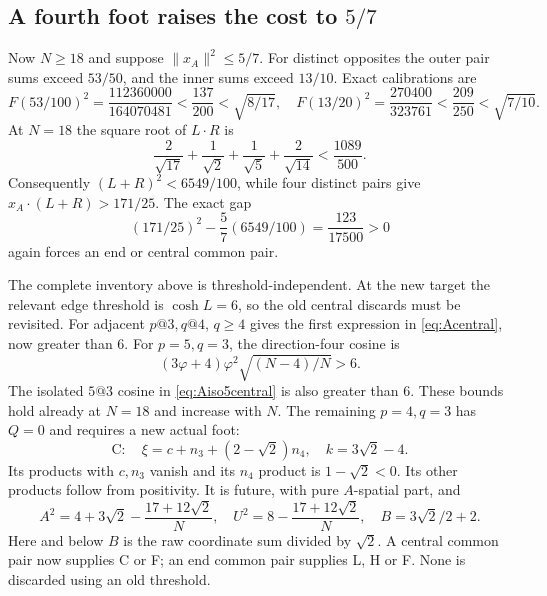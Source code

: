\documentclass[11pt]{article}
\theoremstyle{remark}
\newcommand{\ph}{\varphi}
\begin{document}
\subsection{A fourth foot raises the cost to \texorpdfstring{\(5/7\)}{5/7}}

Now \(N\ge18\) and suppose \(\|x_A\|^2\le5/7\).
For distinct opposites the outer pair sums exceed \(53/50\),
and the inner sums exceed \(13/10\). Exact calibrations are
\[
 F(53/100)^2=\frac{112360000}{164070481}
 <\frac{137}{200}<\sqrt{8/17},\quad
 F(13/20)^2=\frac{270400}{323761}
 <\frac{209}{250}<\sqrt{7/10}.
\]
At \(N=18\) the square root of \(L\cdot R\) is
\[
 \frac2{\sqrt{17}}+\frac1{\sqrt2}+\frac1{\sqrt5}
                 +\frac2{\sqrt{14}}<\frac{1089}{500}.
\]
Consequently \((L+R)^2<6549/100\), while four distinct pairs give
\(x_A\cdot(L+R)>171/25\). The exact gap
\[
 (171/25)^2-\frac57(6549/100)=\frac{123}{17500}>0
\]
again forces an end or central common pair.

The complete inventory above is threshold-independent.
At the new target the relevant edge threshold is \(\cosh L=6\),
so the old central discards must be revisited.
For adjacent \(p@3,q@4\), \(q\ge4\) gives the first expression
in \eqref{eq:Acentral}, now greater than \(6\).
For \(p=5,q=3\), the direction-four cosine is
\[
 (3\ph+4)\ph^2\sqrt{(N-4)/N}>6.
\]
The isolated \(5@3\) cosine in \eqref{eq:Aiso5central} is also
greater than \(6\). These bounds hold already at \(N=18\)
and increase with \(N\).
The remaining \(p=4,q=3\) has \(Q=0\) and requires a new actual foot:
\begin{equation}\label{eq:Cfoot}
 \mathrm C:\quad \xi=c+n_3+(2-\sqrt2)n_4,\quad
 k=3\sqrt2-4.
\end{equation}
Its products with \(c,n_3\) vanish and its \(n_4\) product is
\(1-\sqrt2<0\). Its other products follow from positivity.
It is future, with pure \(A\)-spatial part, and
\[
 A^2=4+3\sqrt2-\frac{17+12\sqrt2}{N},\quad
 U^2=8-\frac{17+12\sqrt2}{N},\quad B=3\sqrt2/2+2 .
\]
Here and below \(B\) is the raw coordinate sum divided by \(\sqrt2\).
A central common pair now supplies C or F; an end common pair
supplies L, H or F. None is discarded using an old threshold.
\end{document}
